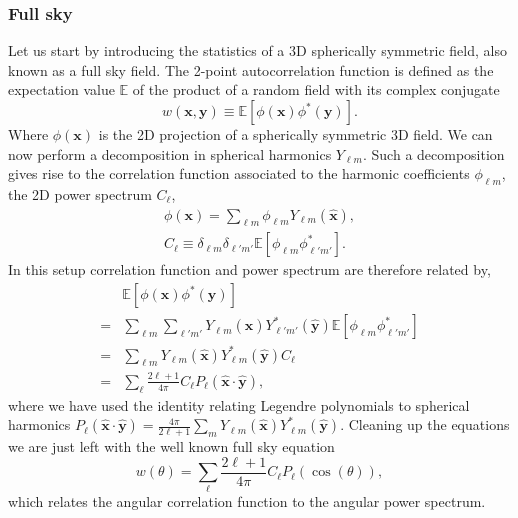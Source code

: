\subsubsection{Full sky}
Let us start by introducing the statistics of a 3D spherically symmetric field, also known as a full sky field. The 2-point autocorrelation function is defined as the expectation value $\mathbb{E}$ of the product of a random field with its complex conjugate
\begin{equation}
    w(\bm{x}, \bm{y}) \equiv \mathbb{E}[\phi(\bm{x})\phi^*(\bm{y})].
\end{equation}
Where $\phi(\bm{x})$ is the 2D projection of a spherically symmetric 3D field. We can now perform a decomposition in spherical harmonics $Y_{\ell m}$. Such a decomposition gives rise to the correlation function associated to the harmonic coefficients $\phi_{\ell m}$, the 2D power spectrum $C_\ell$,
\begin{gather}
    \phi(\bm{x}) = \sum_{\ell m}\phi_{\ell m} Y_{\ell m}(\hat{\bm{x}}),\\
    C_\ell \equiv \delta_{\ell m}\delta_{\ell'm'}\mathbb{E}[ \phi_{\ell m}\phi^*_{\ell'm'}].
\end{gather}
In this setup correlation function and power spectrum are therefore related by,
\begin{align*}
    & \mathbb{E}[\phi(\bm{x})\phi^*(\bm{y})] \\
    =& \sum_{\ell m}\sum_{\ell'm'}Y_{\ell m}(\hat{\bm{x}})Y^*_{\ell'm'}(\hat{\bm{y}}) \mathbb{E}[ \phi_{\ell m}\phi^*_{\ell'm'} ]\\
    =& \sum_{\ell m}Y_{\ell m}(\hat{\bm{x}})Y^*_{\ell m}(\hat{\bm{y}}) C_\ell\\
    =& \sum_{\ell}\frac{2\ell+1}{4\pi}C_\ell P_\ell(\hat{\bm{x}}\cdot\hat{\bm{y}}),
\end{align*}
where we have used the identity relating Legendre polynomials to spherical harmonics $P_\ell(\hat{\bm{x}}\cdot\hat{\bm{y}}) = \frac{4\pi}{2\ell+1} \sum_m Y_{\ell m}(\hat{\bm{x}})Y^*_{\ell m}(\hat{\bm{y}})$. Cleaning up the equations we are just left with the well known full sky equation
\begin{equation}
    w(\theta) = \sum_{\ell}\frac{2\ell+1}{4\pi}C_\ell P_\ell (\cos(\theta)),
    \label{eq:fullsky}
\end{equation}
which relates the angular correlation function to the angular power spectrum.


